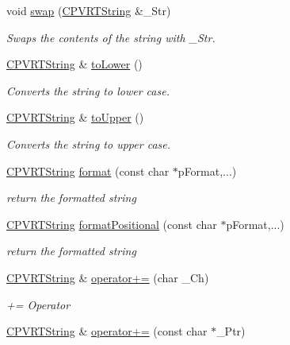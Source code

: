 \begin{DoxyCompactItemize}
void \hyperlink{class_c_p_v_r_t_string_af4aa0d40e0e71b7cd41f52b635139b35}{swap} (\hyperlink{class_c_p_v_r_t_string}{C\+P\+V\+R\+T\+String} \&\+\_\+\+Str)
\begin{DoxyCompactList}\small\item\em Swaps the contents of the string with \+\_\+\+Str. \end{DoxyCompactList}\item 
\hyperlink{class_c_p_v_r_t_string}{C\+P\+V\+R\+T\+String} \& \hyperlink{class_c_p_v_r_t_string_a84bdf409157354e80b364e558d52eaa6}{to\+Lower} ()
\begin{DoxyCompactList}\small\item\em Converts the string to lower case. \end{DoxyCompactList}\item 
\hyperlink{class_c_p_v_r_t_string}{C\+P\+V\+R\+T\+String} \& \hyperlink{class_c_p_v_r_t_string_a7b4746ff021fd8900b2dbbce270082f5}{to\+Upper} ()
\begin{DoxyCompactList}\small\item\em Converts the string to upper case. \end{DoxyCompactList}\item 
\hyperlink{class_c_p_v_r_t_string}{C\+P\+V\+R\+T\+String} \hyperlink{class_c_p_v_r_t_string_a484a1e04c5584d273d88c5ba12412fcf}{format} (const char $\ast$p\+Format,...)
\begin{DoxyCompactList}\small\item\em return the formatted string \end{DoxyCompactList}\item 
\hyperlink{class_c_p_v_r_t_string}{C\+P\+V\+R\+T\+String} \hyperlink{class_c_p_v_r_t_string_a5c9840284dfa7a7338e924c45de94c66}{format\+Positional} (const char $\ast$p\+Format,...)
\begin{DoxyCompactList}\small\item\em return the formatted string \end{DoxyCompactList}\item 
\hyperlink{class_c_p_v_r_t_string}{C\+P\+V\+R\+T\+String} \& \hyperlink{class_c_p_v_r_t_string_a2205e66ce7f148c60bd4302ca5b2c104}{operator+=} (char \+\_\+\+Ch)
\begin{DoxyCompactList}\small\item\em += Operator \end{DoxyCompactList}\item 
\hyperlink{class_c_p_v_r_t_string}{C\+P\+V\+R\+T\+String} \& \hyperlink{class_c_p_v_r_t_string_a7f620a3e8aa6166b6d5183c40db6d920}{operator+=} (const char $\ast$\+\_\+\+Ptr)

\end{DoxyCompactItemize}

